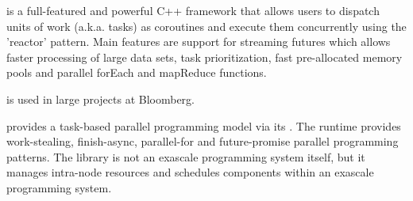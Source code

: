 \cite{bbquantum} is a full-featured and
powerful C++ framework that allows users to dispatch units of work (a.k.a.
tasks) as coroutines and execute them concurrently using the 'reactor' pattern.
Main features are support for streaming futures which allows faster processing
of large data sets, task prioritization, fast pre-allocated memory pools and
parallel forEach and mapReduce functions.

\bbquantum\xspace is used in large projects at Bloomberg.

provides a task-based parallel programming model via its \hclib\cite{hclib}.
The runtime provides work-stealing, finish-async, parallel-for and
future-promise parallel programming patterns. The library is not an exascale
programming system itself, but it manages intra-node resources and schedules
components within an exascale programming system.


